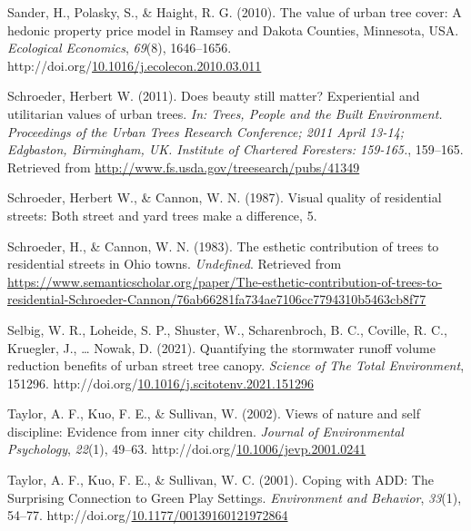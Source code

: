 \documentclass[12pt,twoside]{reedthesis}
\newlength{\cslhangindent}
\newenvironment{CSLReferences}[2] %
 {%
  \setlength{\parindent}{0pt}
  \ifodd #1 \everypar{\setlength{\hangindent}{\cslhangindent}}\ignorespaces\fi
  \ifnum #2 > 0
  \setlength{\parskip}{#2\baselineskip}
  \fi
 }%
 {}
\begin{document}
\begin{CSLReferences}{1}{0}
\leavevmode{}%
Sander, H., Polasky, S., \& Haight, R. G. (2010). The value of urban tree cover: A hedonic property price model in Ramsey and Dakota Counties, Minnesota, USA. \emph{Ecological Economics}, \emph{69}(8), 1646--1656. http://doi.org/\href{https://doi.org/10.1016/j.ecolecon.2010.03.011}{10.1016/j.ecolecon.2010.03.011}

\leavevmode{}%
Schroeder, Herbert W. (2011). Does beauty still matter? Experiential and utilitarian values of urban trees. \emph{In: Trees, People and the Built Environment. Proceedings of the Urban Trees Research Conference; 2011 April 13-14; Edgbaston, Birmingham, UK. Institute of Chartered Foresters: 159-165.}, 159--165. Retrieved from \url{http://www.fs.usda.gov/treesearch/pubs/41349}

\leavevmode{}%
Schroeder, Herbert W., \& Cannon, W. N. (1987). Visual quality of residential streets: Both street and yard trees make a difference, 5.

\leavevmode{}%
Schroeder, H., \& Cannon, W. N. (1983). The esthetic contribution of trees to residential streets in Ohio towns. \emph{Undefined}. Retrieved from \url{https://www.semanticscholar.org/paper/The-esthetic-contribution-of-trees-to-residential-Schroeder-Cannon/76ab66281fa734ae7106cc7794310b5463cb8f77}

\leavevmode{}%
Selbig, W. R., Loheide, S. P., Shuster, W., Scharenbroch, B. C., Coville, R. C., Kruegler, J., \ldots{} Nowak, D. (2021). Quantifying the stormwater runoff volume reduction benefits of urban street tree canopy. \emph{Science of The Total Environment}, 151296. http://doi.org/\href{https://doi.org/10.1016/j.scitotenv.2021.151296}{10.1016/j.scitotenv.2021.151296}

\leavevmode{}%
Taylor, A. F., Kuo, F. E., \& Sullivan, W. (2002). Views of nature and self discipline: Evidence from inner city children. \emph{Journal of Environmental Psychology}, \emph{22}(1), 49--63. http://doi.org/\href{https://doi.org/10.1006/jevp.2001.0241}{10.1006/jevp.2001.0241}

\leavevmode{}%
Taylor, A. F., Kuo, F. E., \& Sullivan, W. C. (2001). Coping with ADD: The Surprising Connection to Green Play Settings. \emph{Environment and Behavior}, \emph{33}(1), 54--77. http://doi.org/\href{https://doi.org/10.1177/00139160121972864}{10.1177/00139160121972864}


\end{CSLReferences}
\end{document}
